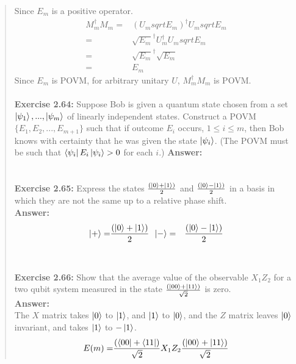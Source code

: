 \documentclass[UTF8]{ctexart}
\begin{document}
\begin{quote}
Since $E_{m}$ is a positive operator.
\begin{equation}
	\begin{aligned}
		M_{m}^{\dagger}M_{m}=&(U_{m}sqrt{E_{m}})^{\dagger}U_{m}sqrt{E_{m}}\\
			 				=&\sqrt{E_{m}}^{\dagger}U_{m}^{\dagger}U_{m}sqrt{E_{m}}\\
							=&\sqrt{E_{m}}^{\dagger}\sqrt{E_{m}}\\
							=&E_{m}
	\end{aligned}
\end{equation}
Since  $E_{m}$ is POVM, for arbitrary unitary $U$, $M_{m}^{\dagger}M_{m}$ is POVM.
\\
\\
\textbf{Exercise 2.64: } Suppose Bob is given a quantum state chosen from a set $\ket{\psi_{1}}, . . . , \ket{\psi_{m}}$
 of linearly independent states. Construct a POVM $\{E_{1},E_{2},...,E_{m+1}\}$ such that if outcome $E_{i}$ occurs,
  $1 \leq i \leq m$, then Bob knows with certainty that he was given the state $\ket{\psi_{i}}$. 
  (The POVM must be such that $\bra{\psi_{i}}E_{i}\ket{\psi_{i}}>0$ for each $i$.)
\textbf{Answer:}\\
	\\
	\\
\textbf{Exercise 2.65: } 
Express the states $\frac{(\ket{0}+\ket{1})}{2}$ and  $\frac{(\ket{0}-\ket{1})}{2}$ in a basis in
which they are not the same up to a relative phase shift.
\\
\textbf{Answer:}\\
\begin{equation}
	\begin{aligned}
		\ket{+}=&\frac{(\ket{0}+\ket{1})}{2} \,\,\,
		\ket{-}=&\frac{(\ket{0}-\ket{1})}{2}
	\end{aligned}
	\end{equation}
\\
\\
\textbf{Exercise 2.66: } Show that the average value of the observable $X_{1}Z_{2}$ for a two qubit
system measured in the state $\frac{(\ket{00}+\ket{11})}{\sqrt{2}}$ is zero.\\
\textbf{Answer:}\\
The $X$ matrix takes $\ket{0}$ to $\ket{1}$, and $\ket{1}$ to $\ket{0}$, and the $Z$ matrix leaves $\ket{0}$ invariant, and takes $\ket{1}$ to $-\ket{1}$.
\begin{equation}
	\begin{aligned}
		E(m)=&\frac{(\bra{00}+\bra{11})}{\sqrt{2}}X_{1}Z_{2}\frac{(\ket{00}+\ket{11})}{\sqrt{2}}\\

\end{aligned}
\end{equation}
\end{quote}
\end{document}
